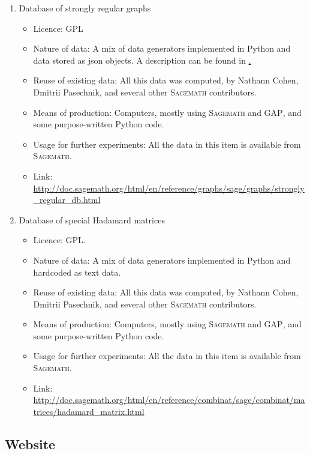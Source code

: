 \documentclass[12pt]{article}
\newcommand{\software}[1]{\textsc{#1}\xspace}
\newcommand{\Sage}{\software{Sagemath}}
\newcommand{\GAP}{\software{GAP}}
\begin{document}
\begin{description}
\begin{enumerate}
\begin{itemize}
\end{itemize}

\item{Database of strongly regular graphs}
\begin{itemize}
\item{Licence:}  GPL
\item{Nature of data:} A mix of data generators implemented in Python and
data stored as json objects. A description can be found in \href{http://arxiv.org/abs/1601.00181}.
\item{Reuse of existing data:} All this data was computed, by Nathann Cohen, Dmitrii Pasechnik,
and several other \Sage contributors.
\item{Means of production:} Computers, mostly using \Sage and \GAP, and some purpose-written
Python code.
\item{Usage for further experiments:} All the data  in this item is available from \Sage.
\item{Link:} \url{http://doc.sagemath.org/html/en/reference/graphs/sage/graphs/strongly_regular_db.html}
\end{itemize}

\item{Database of special Hadamard matrices}
\begin{itemize}
\item{Licence:} GPL.
\item{Nature of data:} A mix of data generators implemented in Python and hardcoded as text data.
\item{Reuse of existing data:} All this data was computed, by Nathann Cohen, Dmitrii Pasechnik,
and several other \Sage contributors.
\item{Means of production:} Computers, mostly using \Sage and \GAP, and some purpose-written
Python code.
\item{Usage for further experiments:} All the data  in this item is available from \Sage.
\item{Link:} \url{http://doc.sagemath.org/html/en/reference/combinat/sage/combinat/matrices/hadamard_matrix.html}
\end{itemize}
\end{enumerate}
\end{description}





\subsection{Website}
\end{document}
